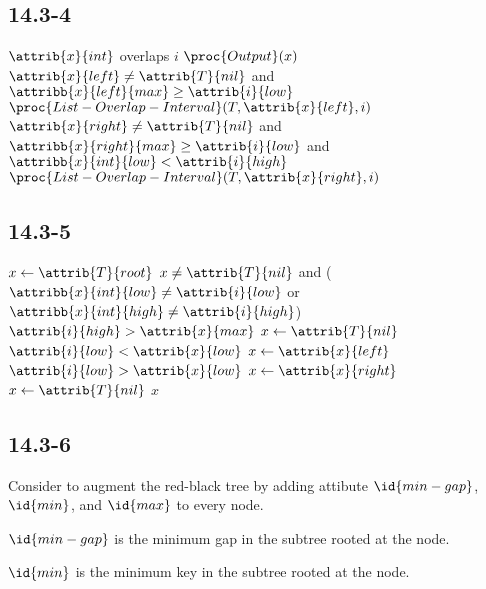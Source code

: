 \subsection*{14.3-4}

\begin{codebox}
    \li \If $\attrib{x}{int}$ overlaps $i$
    \li \Do
            $\proc{Output}(x)$
        \End
        \li \If $\attrib{x}{left} \neq \attrib{T}{nil}$
            and $\attribb{x}{left}{max} \geq \attrib{i}{low}$
    \li \Do
            $\proc{List-Overlap-Interval}(T, \attrib{x}{left}, i)$
        \End
    \li \If $\attrib{x}{right} \neq \attrib{T}{nil}$
        and $\attribb{x}{right}{max} \geq \attrib{i}{low}$
        and $\attribb{x}{int}{low} < \attrib{i}{high}$
    \li \Do
            $\proc{List-Overlap-Interval}(T, \attrib{x}{right}, i)$
        \End
\end{codebox}

\subsection*{14.3-5}

\begin{codebox}
    \li $x \gets \attrib{T}{root}$
    \li \While $x \neq \attrib{T}{nil}$ 
        and ($\attribb{x}{int}{low}\neq \attrib{i}{low}$ 
        or $\attribb{x}{int}{high}\neq \attrib{i}{high}$)
    \li \Do
            \If $\attrib{i}{high} > \attrib{x}{max}$
    \li     \Then
                $x \gets \attrib{T}{nil}$
    \li     \ElseIf $\attrib{i}{low} < \attrib{x}{low}$
    \li     \Then
                $x \gets \attrib{x}{left}$
    \li     \ElseIf $\attrib{i}{low} > \attrib{x}{low}$
    \li     \Then
                $x \gets \attrib{x}{right}$
    \li     \Else
                $x \gets \attrib{T}{nil}$
            \End
        \End
    \li \Return $x$
\end{codebox}

\subsection*{14.3-6}

\noindent
Consider to augment the red-black tree by 
adding attibute $\id{min-gap}$, $\id{min}$, and $\id{max}$ to every node.

$\id{min-gap}$ is the minimum gap in the subtree rooted at the node.

$\id{min}$ is the minimum key in the subtree rooted at the node.

